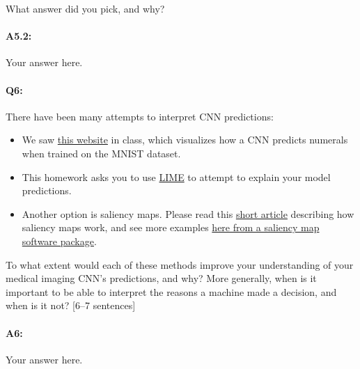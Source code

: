 What answer did you pick, and why?

\paragraph{A5.2:} Your answer here.



\pagebreak
\paragraph{Q6:} There have been many attempts to interpret CNN predictions:
\begin{itemize}
    \item We saw \href{https://www.cs.cmu.edu/~aharley/vis/conv/}{this website} in class, which visualizes how a CNN predicts numerals when trained on the MNIST dataset.
    
    \item This homework asks you to use \href{https://www.oreilly.com/content/introduction-to-local-interpretable-model-agnostic-explanations-lime/}{LIME} to attempt to explain your model predictions. 

    \item Another option is saliency maps. Please read this \href{https://opendatascience.com/visualizing-your-convolutional-neural-network-predictions-with-saliency-maps/}{short article} describing how saliency maps work, and see more examples \href{https://github.com/jacobgil/pytorch-grad-cam}{here from a saliency map software package}.
\end{itemize}

To what extent would each of these methods improve your understanding of your medical imaging CNN's predictions, and why?
More generally, when is it important to be able to interpret the reasons a machine made a decision, and when is it not? [6--7 sentences]

\paragraph{A6:} Your answer here.





\pagebreak

